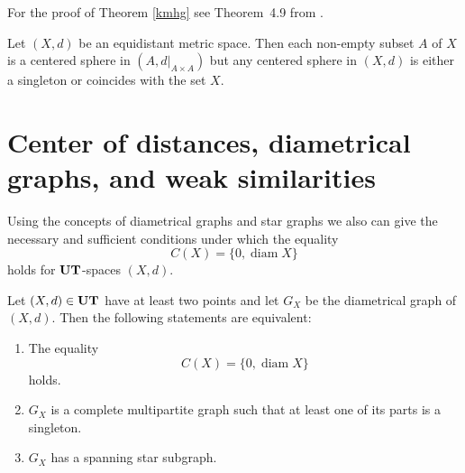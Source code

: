 \documentclass{article}
\begin{document}
For the proof of Theorem \ref{kmhg} see Theorem~4.9 from \cite{DK2024DLPSSAG}.

\begin{Example} Let $(X,d)$ be an equidistant metric space. Then each non-empty subset $A$ of $X$ is a centered sphere in $(A,d|_{A\times A})$ but any centered sphere in $(X,d)$ is either a singleton or coincides with the set $X$.
\end{Example}


\section{Center of distances, diametrical graphs, and weak similarities}\label{sec5}







Using the concepts of diametrical graphs and star graphs we also can give
the necessary and sufficient conditions under which the equality
\[
C(X)=\{0,\operatorname{diam} X\}
\]
holds for ${\bf UT}$-spaces $(X,d)$.





\begin{Theorem}\label{kgcd}
Let $(X,d) \in {\bf UT}$ have at least two points and let $G_X$ be the diametrical graph of $(X,d)$. Then the following statements are equivalent:

\begin{enumerate}[label=\textit{(\roman*)}, left=0pt]
\item The equality
\begin{equation}
    \label{scg}
C(X)=\{0,\operatorname{diam} X\}
\end{equation}
holds.

\item $G_X$ is a complete multipartite graph such that at least one of its parts is a singleton.

\item $G_X$ has a spanning star subgraph.
\end{enumerate}
\end{Theorem}
\end{document}
